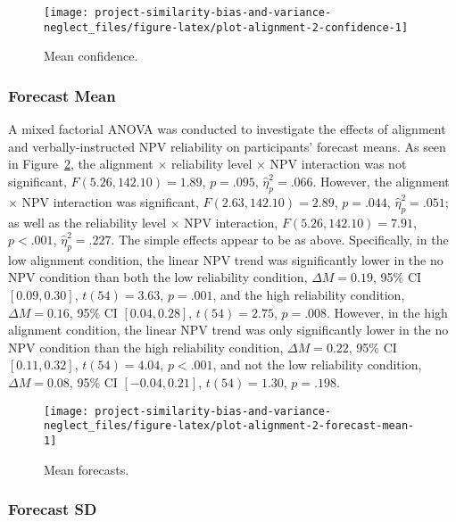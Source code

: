 \documentclass[
  english,
  man, donotrepeattitle,floatsintext]{apa7}
\theoremstyle{definition}
\theoremstyle{definition}
\theoremstyle{definition}
\theoremstyle{definition}
\theoremstyle{remark}
\begin{document}
\begin{figure}
\texttt{[image: project-similarity-bias-and-variance-neglect\_files/figure-latex/plot-alignment-2-confidence-1]} \caption{Mean confidence.}\label{fig:plot-alignment-2-confidence}
\end{figure}

\hypertarget{forecast-mean}{%
\subsubsection{Forecast Mean}\label{forecast-mean}}

A mixed factorial ANOVA was conducted to investigate the effects of alignment
and verbally-instructed NPV reliability on participants' forecast means. As seen
in Figure~\ref{fig:plot-alignment-2-forecast-mean}, the alignment \(\times\)
reliability level \(\times\) NPV interaction was not significant,
\(F(5.26, 142.10) = 1.89\), \(p = .095\), \(\hat{\eta}^2_p = .066\).
However, the alignment \(\times\) NPV interaction was significant,
\(F(2.63, 142.10) = 2.89\), \(p = .044\), \(\hat{\eta}^2_p = .051\); as well as the
reliability level \(\times\) NPV interaction,
\(F(5.26, 142.10) = 7.91\), \(p < .001\), \(\hat{\eta}^2_p = .227\). The simple
effects appear to be as above. Specifically, in the low alignment condition, the
linear NPV trend was significantly lower in the no NPV condition than both the
low reliability condition,
\(\Delta M = 0.19\), 95\% CI \([0.09, 0.30]\), \(t(54) = 3.63\), \(p = .001\), and the high
reliability condition,
\(\Delta M = 0.16\), 95\% CI \([0.04, 0.28]\), \(t(54) = 2.75\), \(p = .008\). However, in the
high alignment condition, the linear NPV trend was only significantly lower in
the no NPV condition than the high reliability condition,
\(\Delta M = 0.22\), 95\% CI \([0.11, 0.32]\), \(t(54) = 4.04\), \(p < .001\), and not the low
reliability condition,
\(\Delta M = 0.08\), 95\% CI \([-0.04, 0.21]\), \(t(54) = 1.30\), \(p = .198\).



\begin{figure}
\texttt{[image: project-similarity-bias-and-variance-neglect\_files/figure-latex/plot-alignment-2-forecast-mean-1]} \caption{Mean forecasts.}\label{fig:plot-alignment-2-forecast-mean}
\end{figure}

\hypertarget{forecast-sd-alignment-2}{%
\subsubsection{Forecast SD}\label{forecast-sd-alignment-2}}
\end{document}
